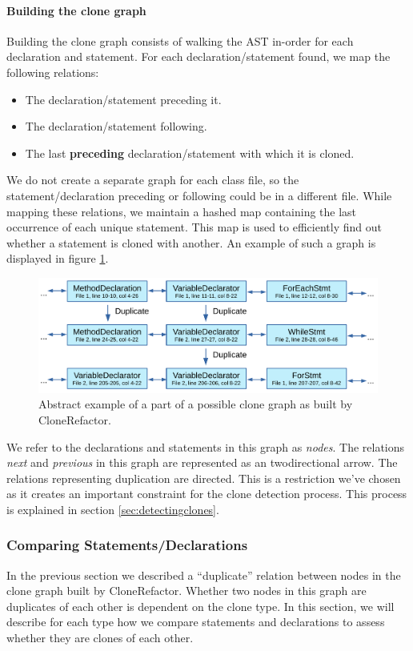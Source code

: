 \paragraph{Building the clone graph}\label{sec:buildingclonegraph}
Building the clone graph consists of walking the AST in-order for each declaration and statement. For each declaration/statement found, we map the following relations:
\begin{itemize}
  \item The declaration/statement preceding it.
  \item The declaration/statement following.
  \item The last \textbf{preceding} declaration/statement with which it is cloned.
\end{itemize}
We do not create a separate graph for each class file, so the statement/declaration preceding or following could be in a different file. While mapping these relations, we maintain a hashed map containing the last occurrence of each unique statement. This map is used to efficiently find out whether a statement is cloned with another. An example of such a graph is displayed in figure \ref{fig:clonegraphsimple}.

\begin{figure}[H]
  \centering
  \includegraphics[width=1\columnwidth]{img/CodeGraph2}
  \caption{Abstract example of a part of a possible clone graph as built by CloneRefactor.}
  \label{fig:clonegraphsimple}
\end{figure}

We refer to the declarations and statements in this graph as \textit{nodes}. The relations \textit{next} and \textit{previous} in this graph are represented as an twodirectional arrow. The relations representing duplication are directed. This is a restriction we've chosen as it creates an important constraint for the clone detection process. This process is explained in section \ref{sec:detectingclones}.

\subsubsection{Comparing Statements/Declarations}
In the previous section we described a ``duplicate'' relation between nodes in the clone graph built by CloneRefactor. Whether two nodes in this graph are duplicates of each other is dependent on the clone type. In this section, we will describe for each type how we compare statements and declarations to assess whether they are clones of each other.

